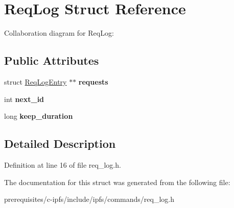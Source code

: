 \hypertarget{struct_req_log}{}\section{Req\+Log Struct Reference}
\label{struct_req_log}


Collaboration diagram for Req\+Log\+:
\subsection*{Public Attributes}
\begin{DoxyCompactItemize}
\item 
\mbox{\label{struct_req_log_a85e5fe4633906a842090efef0e5baf3a}} 
struct \mbox{\hyperlink{struct_req_log_entry}{Req\+Log\+Entry}} $\ast$$\ast$ {\bfseries requests}
\item 
\mbox{\label{struct_req_log_ad6bdc193ddb2d28963396b061fcce081}} 
int {\bfseries next\+\_\+id}
\item 
\mbox{\label{struct_req_log_a35cdb7c48f4b4f052260407845e68cd8}} 
long {\bfseries keep\+\_\+duration}
\end{DoxyCompactItemize}


\subsection{Detailed Description}


Definition at line 16 of file req\+\_\+log.\+h.



The documentation for this struct was generated from the following file\+:\begin{DoxyCompactItemize}
\item 
prerequisites/c-\/ipfs/include/ipfs/commands/req\+\_\+log.\+h\end{DoxyCompactItemize}
